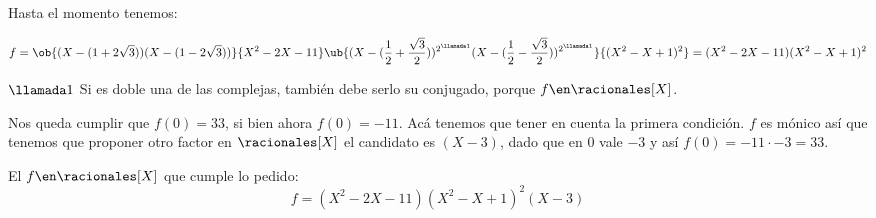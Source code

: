 Hasta el momento tenemos:\par
$$
f =
\ob{(X - (1+2\sqrt{3})) (X - (1-2\sqrt{3}))}{X^2 - 2X - 11}
\ub{(X - (\frac{1}{2} + \frac{\sqrt{3}}{2}))^{2^{\llamada1}}
(X - (\frac{1}{2} - \frac{\sqrt{3}}{2}))^{2^{\llamada1}}}{(X^2 - X + 1)^2} =
(X^2 - 2X - 11)(X^2 - X + 1)^2
$$

$\llamada1$ Si es doble una de las complejas, también debe serlo su conjugado, porque
$f\en \racionales[X]$.\bigskip

Nos queda cumplir que $f(0) = 33$, si bien ahora $f(0) = -11$. Acá tenemos que tener en cuenta
la primera condición. $f$ es mónico así que tenemos que proponer otro factor en $\racionales[X]$
el candidato es $(X-3)$, dado que en 0 vale $-3$ y así $f(0) = -11\cdot -3 = 33$.\par

El $f \en\racionales[X]$ que cumple lo pedido:
$$
\boxed{f = (X^2 - 2X - 11)(X^2 - X + 1)^2(X-3)}
$$



